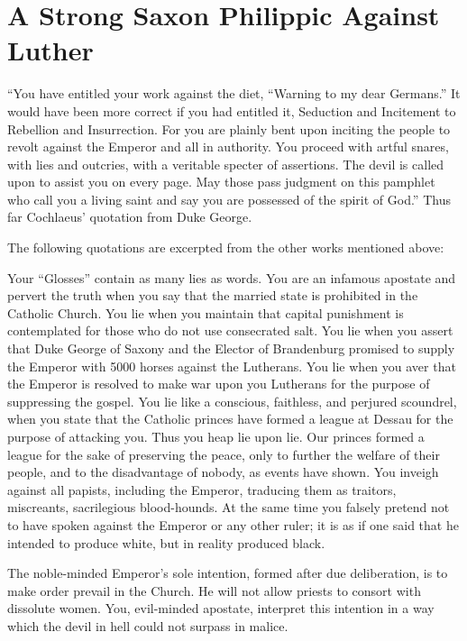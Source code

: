 \section{A Strong Saxon Philippic Against Luther}

“You have entitled your work against the diet, “Warning to my
dear Germans.” It would have been more correct if you had entitled
it, Seduction and Incitement to Rebellion and Insurrection. For you
are plainly bent upon inciting the people to revolt against the Emperor
and all in authority. You proceed with artful snares, with lies
and outcries, with a veritable specter of assertions. The devil is called
upon to assist you on every page. May those pass judgment on
this pamphlet who call you a living saint and say you are possessed
of the spirit of God.” Thus far Cochlaeus’ quotation from Duke
George.

The following quotations are excerpted from the other works mentioned
above:

Your “Glosses” contain as many lies as words. You are an infamous apostate
and pervert the truth when you say that the married state is prohibited
in the Catholic Church. You lie when you maintain that capital punishment
is contemplated for those who do not use consecrated salt. You lie when you
assert that Duke George of Saxony and the Elector of Brandenburg
promised to supply the Emperor with 5000 horses against the Lutherans. You
lie when you aver that the Emperor is resolved to make war upon
you Lutherans for the purpose of suppressing the gospel. You lie like a conscious,
faithless, and perjured scoundrel, when you state that the Catholic princes
have formed a league at Dessau for the purpose of attacking you. Thus you
heap lie upon lie. Our princes formed a league for the sake of preserving the
peace, only to further the welfare of their people, and to the disadvantage
of nobody, as events have shown. You inveigh against all papists, including
the Emperor, traducing them as traitors, miscreants, sacrilegious
blood-hounds. At the same time you falsely pretend not to have spoken
against the Emperor or any other ruler; it is as if one said that he intended
to produce white, but in reality produced black.

The noble-minded Emperor’s sole intention, formed after due deliberation,
is to make order prevail in the Church. He will not allow priests to consort
with dissolute women. You, evil-minded apostate, interpret this intention in
a way which the devil in hell could not surpass in malice.

